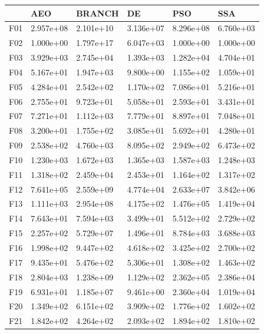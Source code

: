 \documentclass{article}
\begin{document}
\begin{table}[H]
	\centering
\begin{tabular}{|l|lllll|}
	\hline
	{} &        AEO &     BRANCH &         DE &        PSO &        SSA \\
	\hline
	F01  &  2.957e+08 &  2.101e+10 &  3.136e+07 &  8.296e+08 &  6.760e+03 \\
	F02  &  1.000e+00 &  1.797e+17 &  6.047e+03 &  1.000e+00 &  1.000e+00 \\
	F03  &  3.929e+03 &  2.745e+04 &  1.393e+03 &  1.282e+04 &  4.704e+01 \\
	F04  &  5.167e+01 &  1.947e+03 &  9.800e+00 &  1.155e+02 &  1.059e+01 \\
	F05  &  4.284e+01 &  2.542e+02 &  1.170e+02 &  7.086e+01 &  5.216e+01 \\
	F06  &  2.755e+01 &  9.723e+01 &  5.058e+01 &  2.593e+01 &  3.431e+01 \\
	F07  &  7.271e+01 &  1.112e+03 &  7.779e+01 &  8.897e+01 &  7.048e+01 \\
	F08  &  3.200e+01 &  1.755e+02 &  3.085e+01 &  5.692e+01 &  4.280e+01 \\
	F09  &  2.538e+02 &  4.760e+03 &  8.095e+02 &  2.949e+02 &  6.473e+02 \\
	F10  &  1.230e+03 &  1.672e+03 &  1.365e+03 &  1.587e+03 &  1.248e+03 \\
	F11  &  1.318e+02 &  2.459e+04 &  2.453e+01 &  1.164e+02 &  1.317e+02 \\
	F12  &  7.641e+05 &  2.559e+09 &  4.774e+04 &  2.633e+07 &  3.842e+06 \\
	F13  &  1.111e+03 &  2.954e+08 &  4.175e+02 &  1.476e+05 &  1.419e+04 \\
	F14  &  7.643e+01 &  7.594e+03 &  3.499e+01 &  5.512e+02 &  2.729e+02 \\
	F15  &  2.257e+02 &  5.729e+07 &  1.496e+01 &  8.784e+03 &  3.688e+03 \\
	F16  &  1.998e+02 &  9.447e+02 &  4.618e+02 &  3.425e+02 &  2.700e+02 \\
	F17  &  9.435e+01 &  5.476e+02 &  5.306e+01 &  1.308e+02 &  1.463e+02 \\
	F18  &  2.804e+03 &  1.238e+09 &  1.129e+02 &  2.362e+05 &  2.386e+04 \\
	F19  &  6.931e+01 &  1.185e+07 &  9.461e+00 &  2.360e+04 &  1.019e+04 \\
	F20  &  1.349e+02 &  6.151e+02 &  3.909e+02 &  1.776e+02 &  1.602e+02 \\
	F21  &  1.842e+02 &  4.264e+02 &  2.093e+02 &  1.894e+02 &  1.810e+02 \\

\end{tabular}
\end{table}
\end{document}
